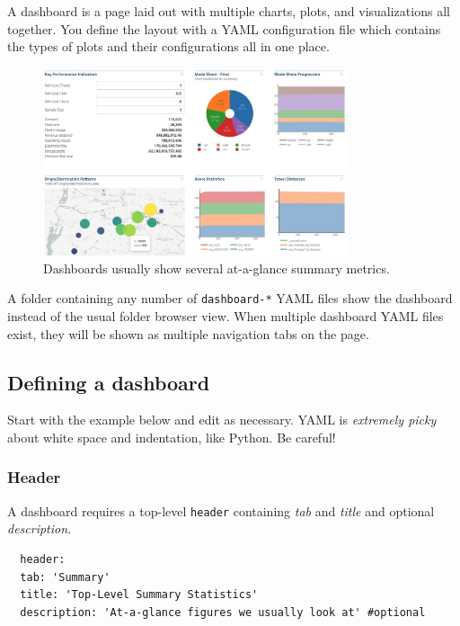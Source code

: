 A dashboard is a page laid out with multiple charts, plots, and
visualizations all together. You define the layout with a YAML
configuration file which contains the types of plots and their
configurations all in one place.

\begin{figure}[H]
  \centering
  \includegraphics[width=0.8\textwidth]{assets/dashboard.jpg}
  \caption{Dashboards usually show several at-a-glance summary metrics.}
\end{figure}

A folder containing any number of \texttt{dashboard-*} YAML files show
the dashboard instead of the usual folder browser view. When multiple
dashboard YAML files exist, they will be shown as multiple navigation
tabs on the page.

\hypertarget{defining-a-dashboard}{%
\subsection{Defining a dashboard}\label{defining-a-dashboard}}

Start with the example below and edit as necessary. YAML is
\emph{extremely picky} about white space and indentation, like Python.
Be careful!

\hypertarget{header}{%
\subsubsection{Header}\label{header}}

A dashboard requires a top-level \texttt{header} containing \emph{tab}
and \emph{title} and optional \emph{description.}

\begin{lstlisting}
  header:
  tab: 'Summary'
  title: 'Top-Level Summary Statistics'
  description: 'At-a-glance figures we usually look at' #optional
\end{lstlisting}


